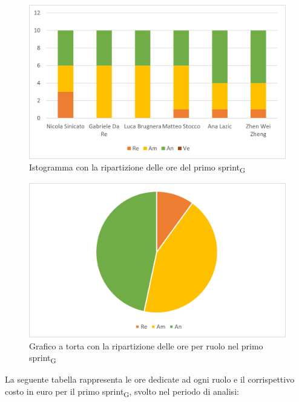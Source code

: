 \begin{figure}[H]
    \centering
    \includegraphics[scale=0.6]{img/grafi preventivo/istogrammi/analisi/sprint1.png}
    \caption{Istogramma con la ripartizione delle ore del primo sprint\textsubscript{G}}
\end{figure}
\begin{figure}[H]
    \centering
    \includegraphics[scale=0.6]{img/grafi preventivo/torta/analisi/sprint1.png}
    \caption{Grafico a torta con la ripartizione delle ore per ruolo nel primo sprint\textsubscript{G}}
\end{figure}

La seguente tabella rappresenta le ore dedicate ad ogni ruolo e il corrispettivo costo in euro per il primo sprint\textsubscript{G}, svolto nel periodo di analisi:

